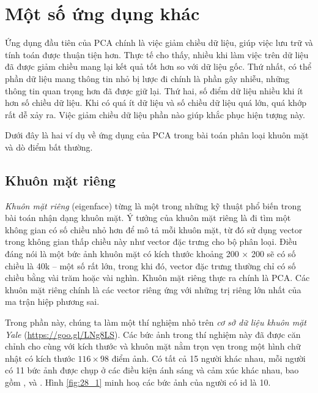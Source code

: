 \section{Một số ứng dụng khác}
Ứng dụng đầu tiên của PCA chính là việc giảm chiều dữ liệu, giúp
việc lưu trữ và tính toán được thuận tiện hơn. Thực tế cho thấy, nhiều khi làm
việc trên dữ liệu đã được giảm chiều mang lại kết quả tốt hơn so với dữ liệu
gốc. Thứ nhất, có thể phần dữ liệu mang thông tin nhỏ bị lược đi chính là phần
gây nhiễu, những thông tin quan trọng hơn đã được giữ lại. Thứ hai, số điểm dữ
liệu nhiều khi ít hơn số chiều dữ liệu. Khi có quá ít dữ liệu và số chiều dữ
liệu quá lớn, quá khớp rất dễ xảy ra. Việc giảm chiều dữ liệu phần nào giúp
khắc phục hiện tượng này.

Dưới đây là hai ví dụ về ứng dụng của PCA trong bài toán phân loại khuôn mặt và dò điểm bất thường.

\subsection{Khuôn mặt riêng}
\textit{Khuôn mặt riêng} (eigenface) từng là một trong những kỹ thuật phổ biến
trong bài toán nhận dạng khuôn mặt. Ý tưởng của khuôn mặt riêng là đi tìm một
không gian có số chiều nhỏ hơn để mô tả mỗi khuôn mặt, từ đó sử dụng vector
trong không gian thấp chiều này như vector đặc trưng cho bộ phân loại. Điều đáng
nói là một bức ảnh khuôn mặt có kích thước khoảng 200 $\times$ 200 sẽ có số
chiều là 40k -- một số rất lớn, trong khi đó, vector đặc trưng thường chỉ có số
chiều bằng vài trăm hoặc vài nghìn. Khuôn mặt riêng thực ra chính là PCA. Các
khuôn mặt riêng chính là các vector riêng ứng với những trị riêng lớn nhất của
ma trận hiệp phương sai.

Trong phần này, chúng ta làm một thí nghiệm nhỏ trên \textit{cơ sở dữ liệu
    khuôn mặt Yale} (\url{https://goo.gl/LNg8LS}). Các bức ảnh trong thí nghiệm
này đã được căn chỉnh cho cùng với kích thước và khuôn mặt nằm trọn vẹn trong
một hình chữ nhật có kích thước $116 \times  98$ điểm ảnh. Có tất cả 15 người khác
nhau, mỗi người có 11 bức ảnh được chụp ở các điều kiện ánh sáng và cảm xúc khác
nhau, bao gồm , và
. Hình \ref{fig:28_1} minh hoạ các bức ảnh của
người có id là 10.

